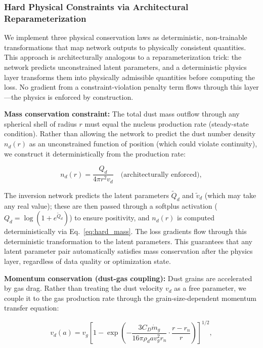 \documentclass[usenatbib]{mnras}
\begin{document}
\subsubsection{Hard Physical Constraints via Architectural Reparameterization}

We implement three physical conservation laws as deterministic, non-trainable transformations that map network outputs to physically consistent quantities. This approach is architecturally analogous to a reparameterization trick: the network predicts unconstrained latent parameters, and a deterministic physics layer transforms them into physically admissible quantities before computing the loss. No gradient from a constraint-violation penalty term flows through this layer---the physics is enforced by construction.

\textbf{Mass conservation constraint:} The total dust mass outflow through any spherical shell of radius $r$ must equal the nucleus production rate (steady-state condition). Rather than allowing the network to predict the dust number density $n_d(r)$ as an unconstrained function of position (which could violate continuity), we construct it deterministically from the production rate:

\begin{equation}\label{eq:hard_mass}
n_d(r) = \frac{Q_d}{4\pi r^2 v_d} \quad \text{(architecturally enforced)},
\end{equation}

The inversion network predicts the latent parameters $\tilde{Q}_d$ and $\tilde{v}_d$ (which may take any real value); these are then passed through a softplus activation ($Q_d = \log(1 + e^{\tilde{Q}_d})$) to ensure positivity, and $n_d(r)$ is computed deterministically via Eq.~\ref{eq:hard_mass}. The loss gradients flow through this deterministic transformation to the latent parameters. This guarantees that any latent parameter pair automatically satisfies mass conservation after the physics layer, regardless of data quality or optimization state.

\textbf{Momentum conservation (dust-gas coupling):} Dust grains are accelerated by gas drag. Rather than treating the dust velocity $v_d$ as a free parameter, we couple it to the gas production rate through the grain-size-dependent momentum transfer equation:

\begin{equation}\label{eq:hard_momentum}
v_d(a) = v_g \left[1 - \exp\left(-\frac{3 C_D \dot{m}_g}{16 \pi \rho_d a v_g^2 r_n} \cdot \frac{r - r_n}{r}\right)\right]^{1/2},
\end{equation}
\end{document}
